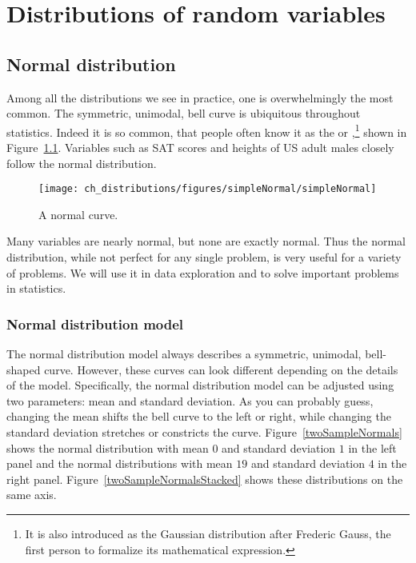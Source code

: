 \chapter{Distributions of random variables}
\label{modeling}


\section[Normal distribution]{Normal distribution ~}
\label{normalDist}

Among all the distributions we see in practice, one is overwhelmingly the most common. The symmetric, unimodal, bell curve is ubiquitous throughout statistics. Indeed it is so common, that people often know it as the  or ,\footnote{It is also introduced as the Gaussian distribution after Frederic Gauss, the first person to formalize its mathematical expression.} shown in Figure~\ref{simpleNormal}. Variables such as SAT scores and heights of US adult males closely follow the normal distribution.

\begin{figure}
\centering
\texttt{[image: ch\_distributions/figures/simpleNormal/simpleNormal]}
\caption{A normal curve.}
\label{simpleNormal}
\end{figure}

\begin{termBox}{
Many variables are nearly normal, but none are exactly normal. Thus the normal distribution, while not perfect for any single problem, is very useful for a variety of problems. We will use it in data exploration and to solve important problems in statistics.\vspace{0.7mm}}
\end{termBox}


\subsection{Normal distribution model}

The normal distribution model always describes a symmetric, unimodal, bell-shaped curve. However, these curves can look different depending on the details of the model. Specifically, the normal distribution model can be adjusted using two parameters: mean and standard deviation. As you can probably guess, changing the mean shifts the bell curve to the left or right, while changing the standard deviation stretches or constricts the curve. Figure~\ref{twoSampleNormals} shows the normal distribution with mean $0$ and standard deviation $1$ in the left panel and the normal distributions with mean $19$ and standard deviation $4$ in the right panel. Figure~\ref{twoSampleNormalsStacked} shows these distributions on the same axis.

